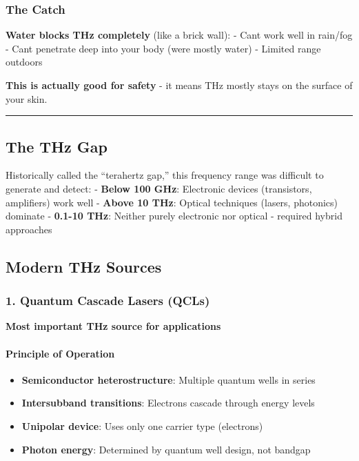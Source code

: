 \subsubsection{The Catch}\label{the-catch}

\textbf{Water blocks THz completely} (like a brick wall): -
Can\textquotesingle t work well in rain/fog - Can\textquotesingle t
penetrate deep into your body (we\textquotesingle re mostly water) -
Limited range outdoors

\textbf{This is actually good for safety} - it means THz mostly stays on
the surface of your skin.

\begin{center}\rule{0.5\linewidth}{0.5pt}\end{center}

\subsection{The THz Gap}\label{the-thz-gap}

Historically called the ``terahertz gap,'' this frequency range was
difficult to generate and detect: - \textbf{Below 100 GHz}: Electronic
devices (transistors, amplifiers) work well - \textbf{Above 10 THz}:
Optical techniques (lasers, photonics) dominate - \textbf{0.1-10 THz}:
Neither purely electronic nor optical - required hybrid approaches

\subsection{Modern THz Sources}\label{modern-thz-sources}

\subsubsection{1. Quantum Cascade Lasers
(QCLs)}\label{quantum-cascade-lasers-qcls}

\textbf{Most important THz source for applications}

\paragraph{Principle of Operation}\label{principle-of-operation}

\begin{itemize}
\tightlist
\item
  \textbf{Semiconductor heterostructure}: Multiple quantum wells in
  series
\item
  \textbf{Intersubband transitions}: Electrons cascade through energy
  levels
\item
  \textbf{Unipolar device}: Uses only one carrier type (electrons)
\item
  \textbf{Photon energy}: Determined by quantum well design, not bandgap
\end{itemize}

